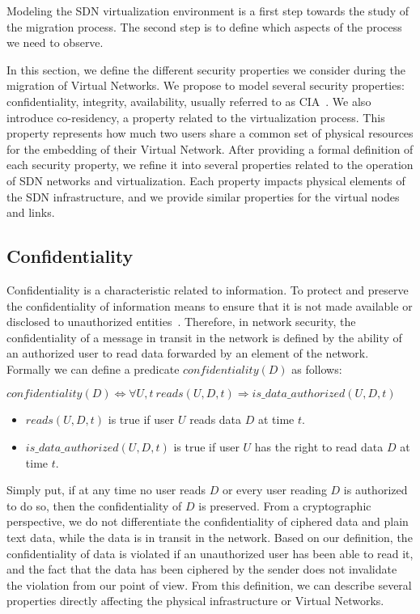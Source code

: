 \label{sec:security_prop}
Modeling the SDN virtualization environment is a first step towards the study of the migration process. The second step is to define which aspects of the process we need to observe.

In this section, we define the different security properties we consider during the migration of Virtual Networks.
We propose to model several security properties: confidentiality, integrity, availability, usually referred to as CIA~\cite{ISO/IEC270012013}. We also introduce co-residency, a property related to the virtualization process. This property represents how much two users share a common set of physical resources for the embedding of their Virtual Network.
After providing a formal definition of each security property, we refine it into several properties related to the operation of SDN networks and virtualization. 
Each property impacts physical elements of the SDN infrastructure, and we provide similar properties for the virtual nodes and links.

\subsection{Confidentiality}
\label{sec:prop-conf}
Confidentiality is a characteristic related to information.
To protect and preserve the confidentiality of information means to ensure that it is not made available or disclosed to unauthorized entities~\cite{ISO/IEC270012013}.
Therefore, in network security, the confidentiality of a message in transit in the network is defined by the ability of an authorized  user to read data forwarded by an element of the network.
Formally we can define a predicate $confidentiality(D)$ as follows:

\begin{myformula}
$ confidentiality(D) \Leftrightarrow \forall U,t~reads(U,D,t) \Rightarrow is\_data\_authorized(U,D,t)$
\end{myformula}

\begin{itemize}
\item $reads(U,D,t)$ is true if user $U$ reads data $D$ at time $t$.
\item $is\_data\_authorized(U,D,t)$ is true if user $U$ has the right to read data $D$ at time $t$.
\end{itemize}
Simply put, if at any time no user reads $D$ or every user reading $D$ is authorized to do so, then the confidentiality of $D$ is preserved.
From a cryptographic perspective, we do not differentiate the confidentiality of ciphered data and plain text data, while the data is in transit in the network.
Based on our definition, the confidentiality of data is violated if an unauthorized user has been able to read it, and the fact that the data has been ciphered by the sender does not invalidate the violation from our point of view.
From this definition, we can describe several properties directly affecting the physical infrastructure or Virtual Networks.



